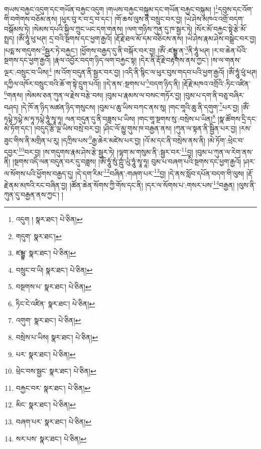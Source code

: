 གཡས་བརྐྱང་འདུག་དང་གཡོན་བརྐྱང་འདུག །གཡས་བརྐྱང་བསྐུམ་དང་གཡོན་བརྐྱང་བསྐུམ། །\footnote{འདུག །  སྣར་ཐང་།  པེ་ཅིན། }དབུས་དང་འོག་གི་བགེགས་བཅོམ་ནས། །ཕུར་བུ་ར་བ་དྲ་བ་དང་། །གོ་ཆས་ལུས་ནི་བསྲུང་བར་བྱ། །ཡེ་ཤེས་མཁའ་འགྲོ་བདག་བསྒོམས་ཏེ། །སེམས་དཔའི་སྐྱིལ་ཀྲུང་ཡང་དག་གནས། །ལག་གཉིས་ཀུན་དུ་ཁ་སྦྱར་ཏེ། །སོར་མོ་བརྐྱང་སྟེ་རྩེ་མོ་སྤྲད། །ཨོཾ་ཧཱུཾ་ཕུ་ཕཊ། དྲ་བའི་སྔགས་དང་ཕྱག་རྒྱའོ། །རྡོ་རྗེ་ཐལ་མོ་དམ་བཅིངས་ནས། །ཡེ་ཤེས་རྣམ་ཤེས་བསྒྲེང་བར་བྱ། །པདྨ་ས་གདུགས་\footnote{གདུག་  སྣར་ཐང་། }སྦྱར་ཏེ་བརྐྱང་། །ཕྱོགས་བརྒྱད་དུ་ནི་བསྐོར་བར་བྱ། །ཨོཾ་:ཛམྦྷཱ་ན་\footnote{ཛམྦྷ་  སྣར་ཐང་།  པེ་ཅིན། }ནི་ཧཱུཾ་ཕཊ། །ར་བ་ཆེན་པོའི་སྔགས་དང་ཕྱག་རྒྱའོ། །རྣལ་འབྱོར་བདག་ཉིད་ལག་བརྐྱང་སྟ། །དེར་ནི་རྡོ་རྗེ་བརྟགས་ནས་ཀྱང་། །ས་ལ་གནས་ལྔར་:བསྲུང་བ་ཡིས།\footnote{བསྲུང་བ་ཡི།  སྣར་ཐང་།  པེ་ཅིན། } །ས་འོག་བདུན་ནི་སྦྱར་བར་བྱ། །འདི་ནི་སྙིང་ལ་ཕུར་བུས་གདབ་པའི་ཕྱག་རྒྱའོ། །ཨོཾ་ཧཱུཾ་ཕུཾ་ཕཊ། དཀྱིལ་འཁོར་བསྲུང་བའི་ཆོ་ག་སྟེ་དྲུག་པའོ།། །།དེ་ནས་:སྔགས་པ་\footnote{བསྔགས་པ་  སྣར་ཐང་།  པེ་ཅིན། }བདག་ཉིད་ནི། །རྡོ་རྗེ་མཁའ་འགྲོའི་:ཏིང་འཛིན་\footnote{ཏིང་ངེ་འཛིན་  སྣར་ཐང་།  པེ་ཅིན། }གནས། །སེམས་ཅན་ཀུན་ལ་རྗེས་བརྩེ་བས། །བུམ་པ་རྣམས་ལ་བསང་གཏོར་བྱ། །བུམ་པ་དག་ནི་བཅུ་བཞིར་བཤད། །དེ་ཁོ་ན་ཉིད་མཚན་ཉིད་གསུངས། །བུམ་པ་ཆུ་ཡིས་བཀང་ནས་སུ། །གང་གཱའི་ཆུ་ནི་དགུག་\footnote{འགུག་  སྣར་ཐང་།  པེ་ཅིན། }པར་བྱ། །ཨོཾ་ཏཔྟེ་ཏཔྟེ་མ་ཧཱ་ཏཔྟེ་ཧཱུཾ་སྭཱ་ཧཱ། ལན་བདུན་དུ་ནི་བཟླས་པ་ཡིས། །གང་གཱ་སྔགས་སུ་:བསྲེས་པ་ཡིན།\footnote{བསྲེས་པ་ཡིས།  སྣར་ཐང་།  པེ་ཅིན། } །སྣ་ཚོགས་དྲི་དང་མེ་ཏོག་དང་། །བདུད་རྩི་ལྔ་ཡིས་བསྲེ་བར་བྱ། །ཤིང་ལོ་མྱུ་གུས་ཁ་བརྒྱན་ནས། །ཀུན་ལ་སྟན་ནི་སྦྱིན་པར་བྱ། །རས་ཟུང་གིས་ནི་མགྲིན་པ་རུ། །དཀྲིས་པས་\footnote{པར་  སྣར་ཐང་།  པེ་ཅིན། }རྒྱ་ཆེར་མཛེས་པར་བྱ། །འོ་མ་དང་ནི་བསྲེས་ནས་ནི། །མེ་ཏོག་:ཕྲེང་བ་དབྱར་\footnote{ཕྲེང་བས་སྦྱང་  སྣར་ཐང་།  པེ་ཅིན། }བར་བྱ། །ས་གདུགས་རྣམ་ཤེས་རྩེ་སྦྱར་ཏེ། །ལྷག་མ་གསུམ་ནི་:སྦྱར་བར་\footnote{བརྐྱང་བར་  སྣར་ཐང་།  པེ་ཅིན། }བྱ། །བུམ་པ་ཀུན་ལ་རེག་ནས་ནི། །སྔགས་འདི་ལན་བདུན་བར་དུ་བཟླས། །ཨོཾ་ཧཱུཾ་སུཾ་ཀྵུཾ་ཡུཾ་ཧཱུཾ་སྭཱ་ཧཱ། བུམ་པ་བཞག་པའི་སྔགས་དང་ཕྱག་རྒྱའོ། །ཤར་ལ་སོགས་པའི་ཕྱོགས་བརྒྱད་དུ། །དེ་དག་རིམ་\footnote{མིང་  སྣར་ཐང་།  པེ་ཅིན། }བཞིན་:གཞག་པར་\footnote{བཞག་པར་  སྣར་ཐང་།  པེ་ཅིན། }བྱ། །དེ་ནས་སློབ་དཔོན་བདག་གི་ལུས། །རྡོ་རྗེ་ནམ་མཁའི་རང་བཞིན་བྱ། །ཚོན་ཆེན་སོགས་ཀྱི་གོས་དང་ནི། །དར་ལ་སོགས་པ་:གསར་པས་\footnote{སར་པས་  སྣར་ཐང་།  པེ་ཅིན། }བརྒྱན། །ལུས་ནི་ཀུན་དུ་བརྒྱན་ནས་ཀྱང་། །
